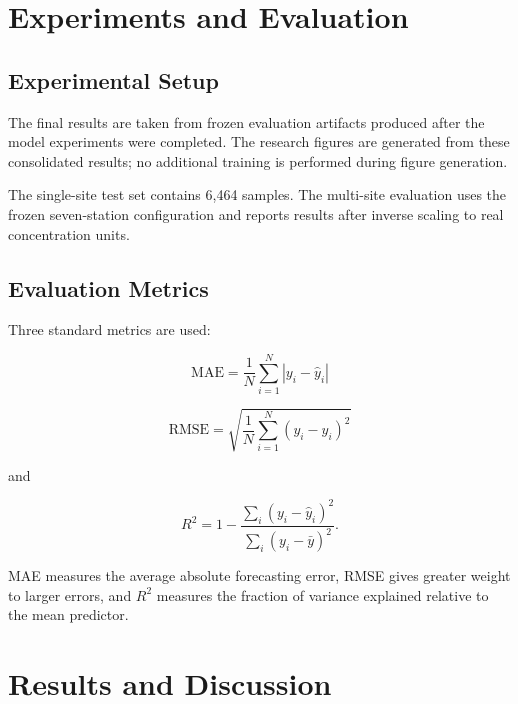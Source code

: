 \documentclass[conference]{IEEEtran}
\begin{document}
\section{Experiments and Evaluation}

\subsection{Experimental Setup}

The final results are taken from frozen evaluation artifacts produced after the model
experiments were completed. The research figures are generated from these consolidated
results; no additional training is performed during figure generation.

The single-site test set contains 6,464 samples. The multi-site evaluation uses the frozen
seven-station configuration and reports results after inverse scaling to real concentration
units.

\subsection{Evaluation Metrics}

Three standard metrics are used:

\begin{equation}
\mathrm{MAE} =
\frac{1}{N}\sum_{i=1}^{N}|y_i-\hat{y}_i|
\end{equation}

\begin{equation}
\mathrm{RMSE} =
\sqrt{\frac{1}{N}\sum_{i=1}^{N}(y_i-\hat{y}_i)^2}
\end{equation}

and

\begin{equation}
R^2 =
1-\frac{\sum_i(y_i-\hat{y}_i)^2}
{\sum_i(y_i-\bar{y})^2}.
\end{equation}

MAE measures the average absolute forecasting error, RMSE gives greater weight to larger
errors, and $R^2$ measures the fraction of variance explained relative to the mean predictor.

\section{Results and Discussion}
\end{document}
